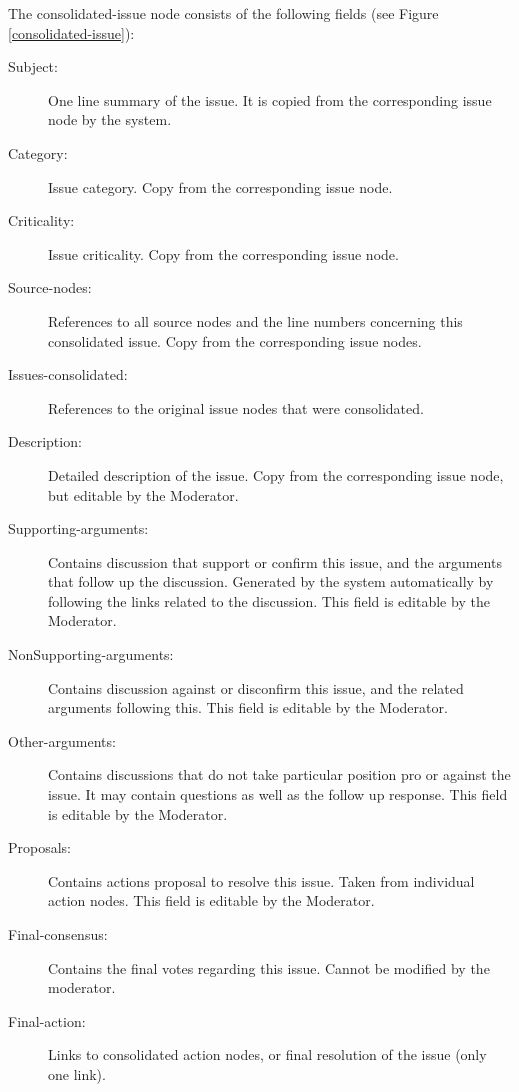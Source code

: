 \noindent The consolidated-issue node consists of the following fields
(see Figure \ref{consolidated-issue}):
\begin{description}
\item [Subject:] One line summary of the issue. It is copied from the
corresponding issue node by the system.

\item [Category:] Issue category. Copy from the corresponding issue node.

\item [Criticality:] Issue criticality. Copy from the corresponding
issue node.

\item [Source-nodes:] References to all source nodes and the line
numbers concerning this consolidated issue. Copy
from the corresponding issue nodes.

\item [Issues-consolidated:] References to the original issue nodes
that were consolidated.

\item [Description:] Detailed description of the issue. Copy from the
corresponding issue node, but editable by the Moderator.

\item [Supporting-arguments:] 
Contains discussion that support or confirm this issue, and the 
arguments that follow up the discussion.
Generated by the system automatically by following the links
related to the discussion. This field is editable by the Moderator.

\item [NonSupporting-arguments:] 
Contains discussion  against or disconfirm this issue, and the
related arguments following this. This field is editable by the Moderator.

\item [Other-arguments:]
Contains discussions that do not take particular position pro
or against the issue. It may contain questions as well as the follow
up response. This field is editable by the Moderator.

\item [Proposals:] 
Contains actions proposal to resolve this issue.
Taken from individual action nodes. This field is editable by the Moderator.

\item [Final-consensus:]
Contains the final votes regarding this issue. Cannot be modified
by the moderator.

\item [Final-action:] Links to consolidated action nodes, or
final resolution of the issue (only one link). 

\end{description}

